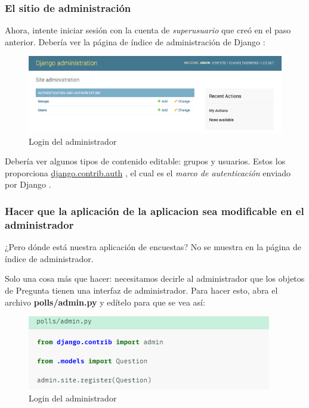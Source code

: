 \documentclass[10pt]{article}
\newcommand{\django}[1]{{\textcolor{G}{Django} #1}}
\begin{document}
\subsubsection*{El sitio de administración}

Ahora, intente iniciar sesión con la cuenta de \textit{superusuario} que creó en el paso anterior. Debería ver la página de índice de administración de \django{}:

\begin{figure}[H]
\begin{center}
\includegraphics[scale=0.9]{figuras/3/32/325/img2.png}
\caption{Login del administrador}
\end{center}
\end{figure}


Debería ver algunos tipos de contenido editable: grupos y usuarios. Estos los proporciona {\href{https://docs.djangoproject.com/en/3.0/topics/auth/#module-django.contrib.auth}{\textcolor{B}{django.contrib.auth}}}
, el cual es el \textit{marco de autenticación} enviado por \django{}.

\subsubsection*{Hacer que la aplicación de la aplicacion sea modificable en el administrador}

¿Pero dónde está nuestra aplicación de encuestas? No se muestra en la página de índice de administrador.

Solo una cosa más que hacer: necesitamos decirle al administrador que los objetos de Pregunta tienen una interfaz de administrador. Para hacer esto, abra el archivo \textbf{polls/admin.py} y edítelo para que se vea así:

\begin{figure}[H]
\begin{center}
\includegraphics[scale=0.9]{figuras/3/32/325/img3.png}
\caption{Login del administrador}
\end{center}
\end{figure}
\end{document}
